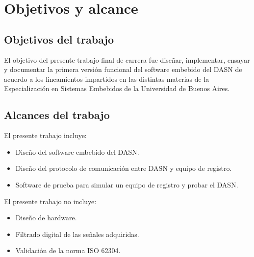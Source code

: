 \section{Objetivos y alcance}
\subsection{Objetivos del trabajo}

El objetivo del presente trabajo final de carrera fue diseñar, implementar, ensayar y documentar la primera versión funcional del software embebido del DASN de acuerdo a los lineamientos impartidos en las distintas materias de la Especialización en Sistemas Embebidos de la Universidad de Buenos Aires.

\subsection{Alcances del trabajo}
El presente trabajo incluye:
\begin{itemize}
\item Diseño del software embebido del DASN.
\item Diseño del protocolo de comunicación entre DASN y equipo de registro.
\item Software de prueba para simular un equipo de registro y probar el DASN.
\end{itemize}

El presente trabajo no incluye:
\begin{itemize}
\item Diseño de hardware.
\item Filtrado digital de las señales adquiridas.
\item Validación de la norma ISO 62304.
\end{itemize}

